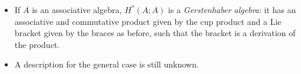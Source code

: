 \documentclass{beamer}
\theoremstyle{definition}
\begin{document}
\begin{frame}
\begin{itemize}

\item<1-> If $A$ is an associative algebra, $H^*(A;A)$ is a \emph{Gerstenhaber algebra}: it has an associative and commutative product given by the cup product and a Lie bracket given by the braces as before, such that the bracket is a derivation of the product.
\item<2-> A description for the general case is still unknown.
\end{itemize}



\end{frame}
\end{document}
